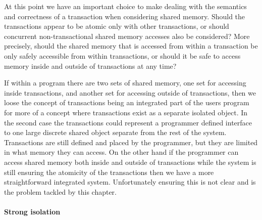 
At this point we have an important choice to make dealing with the
semantics and correctness of a transaction when considering shared memory.
Should the transactions appear to be atomic only with other transactions, or should
concurrent non-transactional shared memory accesses also be considered?
More precisely, should the shared memory that is accessed from within a transaction
be only safely accessible from within transactions, or should it be
safe to access memory inside and outside of transactions at any time?

If within a program there are two sets of shared memory, one set for accessing inside
transactions, and another set for accessing outside of transactions, then we loose 
the concept of transactions being an integrated part of the users program for more of a
concept where transactions exist as a separate isolated object.
In the second case the transactions could represent a programmer defined
interface to one large discrete shared object separate from the rest of the system.
Transactions are still defined and placed by the programmer, but they are limited
in what memory they can access.
On the other hand if the programmer can access shared memory both inside and outside
of transactions while the system is still ensuring the atomicity of the transactions then
we have a more straightforward integrated system.
Unfortunately ensuring this is not clear and is the problem tackled by this chapter.



\paragraph{Strong isolation}

